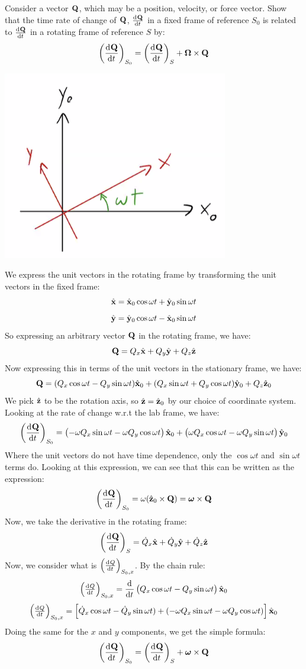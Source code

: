 \documentclass[../PHYS306Notes.tex]{subfiles}
\begin{document}
\begin{p}
Consider a vector $\mathbf{Q}$, which may be a position, velocity, or force vector. Show that the time rate of change of $\mathbf{Q}$, $\od{\v{Q}}{t}$ in a fixed frame of reference $S_0$ is related to $\od{\v{Q}}{t}$ in a rotating frame of reference $S$ by:
\[\left(\dod{\v{Q}}{t}\right)_{S_0} = \left(\dod{\v{Q}}{t}\right)_{S} + \v{\Omega} \times \v{Q}\]
\end{p}
\begin{s}
\begin{center}
    \includegraphics[scale=0.75]{Lecture-15/w15-img2.png}
\end{center}
We express the unit vectors in the rotating frame by transforming the unit vectors in the fixed frame:
\[\hat{\mathbf{x}} = \hat{\mathbf{x}}_0\cos\omega t + \hat{\mathbf{y}}_0\sin\omega t\]
\[\hat{\mathbf{y}} = \hat{\mathbf{y}}_0\cos\omega t - \hat{\mathbf{x}}_0\sin\omega t\]
So expressing an arbitrary vector $\mathbf{Q}$ in the rotating frame, we have:
\[\mathbf{Q} = Q_x\hat{\mathbf{x}} + Q_y\hat{\mathbf{y}} + Q_z\hat{\mathbf{z}}\]
Now expressing this in terms of the unit vectors in the stationary frame, we have:
\[\mathbf{Q} = (Q_x\cos\omega t - Q_y\sin\omega t)\hat{\mathbf{x}}_0 + (Q_x\sin\omega t + Q_y\cos\omega t)\hat{\mathbf{y}}_0 + Q_z\hat{\mathbf{z}}_0\]
We pick $\hat{\mathbf{z}}$ to be the rotation axis, so $\hat{\mathbf{z}} = \hat{\mathbf{z}}_0$ by our choice of coordinate system. Looking at the rate of change w.r.t the lab frame, we have:
\[\left(\dod{\v{Q}}{t}\right)_{S_0} = \left(-\omega Q_x\sin\omega t - \omega Q_y\cos\omega t\right)\xhat_0 + \left(\omega Q_x\cos\omega t - \omega Q_y \sin \omega t\right)\yhat_0 \]
Where the unit vectors do not have time dependence, only the $\cos\omega t$ and $\sin\omega t$ terms do. Looking at this expression, we can see that this can be written as the expression:
\[\left(\dod{\v{Q}}{t}\right)_{S_0} = \omega(\zhat_0 \times \v{Q}) = \bm{\omega} \times \v{Q}\]
Now, we take the derivative in the rotating frame:
\[\left(\dod{\v{Q}}{t}\right)_{S} = \dot{Q}_x\xhat + \dot{Q}_y \yhat + \dot{Q}_z \zhat\]
Now, we consider what is $\left(\od{Q}{t}\right)_{S_0, x}$. By the chain rule:
\[\left(\od{Q}{t}\right)_{S_0, x} = \dod{}{t}\left(Q_x\cos\omega t - Q_y\sin\omega t\right)\xhat_0\]
\[\left(\od{Q}{t}\right)_{S_0, x} = \left[\dot{Q}_x\cos\omega t - \dot{Q}_y\sin\omega t) + (-\omega Q_x\sin\omega t - \omega Q_y\cos\omega t)\right]\xhat_0\]
Doing the same for the $x$ and $y$ components, we get the simple formula:
\[\left(\dod{\v{Q}}{t}\right)_{S_0} = \left(\dod{\v{Q}}{t}\right)_{S} + \bm{\omega}\times\v{Q}\]
\end{s}
\end{document}
